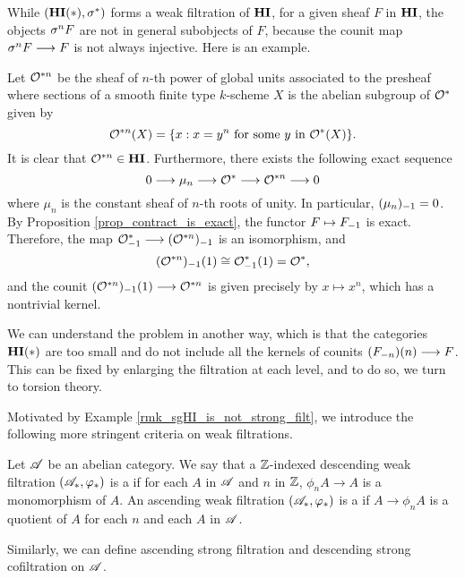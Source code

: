 \begin{ex}\label{rmk_sgHI_is_not_strong_filt}
While $(\HI(*), \sgHI{*})$ forms a weak filtration of $\HI$, for
a given sheaf $F$ in $\HI$, the objects $\sgHI{n} F$ are not 
in general subobjects of $F$, because the counit map $\sgHI{n} F
\to F$ is not always injective. Here is an example.

Let $\Oxn$ be the sheaf of $n$-th power of global units 
associated to the presheaf where sections of a smooth finite type 
$k$-scheme $X$ is the abelian subgroup of $\Ox$ given by 
\[
\Oxn(X) = \{x : x=y^n\textrm{ for some }y \textrm{ in } \Ox(X)\}.
\]
It is clear that $\Oxn \in \HI$. Furthermore, there exists the 
following exact sequence 
\[
0 \to \mu_n \to \Ox \to \Oxn \to 0
\]
where $\mu_n$ is the constant sheaf of $n$-th roots of unity.
In particular, $\RHI{(\mu_n)} = 0$. By Proposition 
\ref{prop_contract_is_exact}, the functor $F \mapsto \RHI{F}$ is
exact. Therefore, the map $\RHI{\Ox} \to \RHI{(\Oxn)}$ is an
isomorphism, and
\[
\LHI{\RHI{(\Oxn)}} \cong \LHI{\RHI{\Ox}} = \Ox,
\]
and the counit $\LHI{\RHI{(\Oxn)}} \to \Oxn$ is given precisely by
$x \mapsto x^n$, which has a nontrivial kernel.

We can understand the problem in another way, which is that the 
categories $\HI(*)$ are too small and do not include all
the kernels of counits $\LHI[n]{(\RHI[n]{F})} \to F$. This can be 
fixed by enlarging the filtration at each level, and to do so, we 
turn to torsion theory.
\end{ex}

Motivated by Example \ref{rmk_sgHI_is_not_strong_filt}, we 
introduce the following more stringent criteria on weak
filtrations.

\begin{defn}\label{def_strong_filtration}
  Let $\Cat{A}$ be an abelian category. We say that a $\Z$-indexed
  descending weak filtration $(\Cat{A}_*, \phi_*)$ is a  if for each $A$ in $\Cat{A}$ and $n$ in $\Z$, $\phi_n
  A \to A$ is a monomorphism of $A$. An ascending weak filtration
  $(\Cat{A}_*, \phi_*)$ is a  if $A \to
  \phi_n A$ is a quotient of $A$ for each $n$ and each $A$ in
  $\Cat{A}$.

  Similarly, we can define ascending strong filtration and descending
  strong cofiltration on $\Cat{A}$.
\end{defn}


